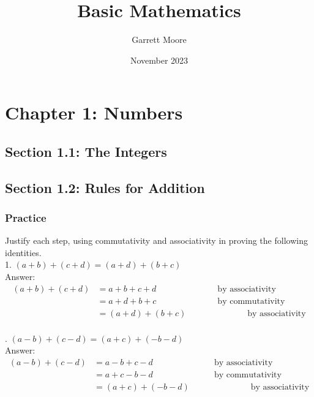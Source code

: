 \documentclass{article}
\title{Basic Mathematics \cite{lang}}
\author{Garrett Moore}
\date{November 2023}
\begin{document}
\maketitle

\newpage
\section*{Chapter 1: Numbers}
\subsection*{Section 1.1: The Integers}

\newpage
\subsection*{Section 1.2: Rules for Addition}
\subsubsection*{Practice}
Justify each step, using commutativity and associativity in proving the following identities.\\
1. $(a + b) + (c + d) = (a + d) + (b + c)$\\
Answer:\\
\begin{align*}
    (a+b)+(c+d) &= a + b + c + d \hspace{3cm}\text{by associativity}\\
    &= a + d + b + c \hspace{3cm} \text{by commutativity}\\
    &= (a + d) + (b + c) \hspace{3cm} \text{by associativity}\\
\end{align*}

. $(a - b) + (c - d) = (a + c) + (-b - d)$\\
Answer:\\
\begin{align*}
    (a - b) + (c - d) &= a - b + c - d \hspace{3cm}\text{by associativity}\\
    &= a + c - b - d \hspace{3cm} \text{by commutativity}\\
    &= (a + c) + (-b - d) \hspace{3cm} \text{by associativity}\\
\end{align*}
\end{document}
